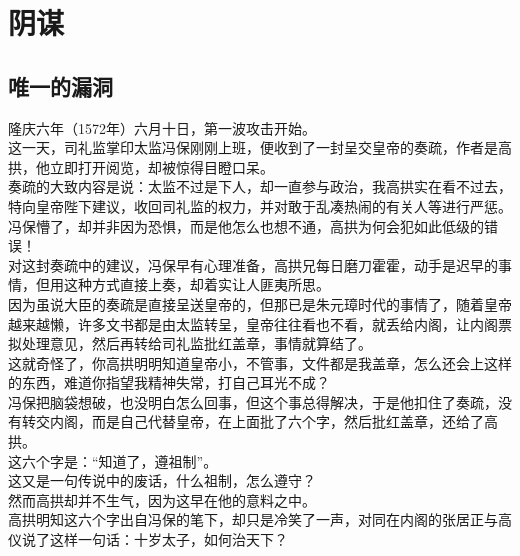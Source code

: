\section{阴谋}
\ifnum{}
	\begin{multicols}{\theparacolNo}
\fi
\subsection{唯一的漏洞}
隆庆六年（1572年）六月十日，第一波攻击开始。\\

这一天，司礼监掌印太监冯保刚刚上班，便收到了一封呈交皇帝的奏疏，作者是高拱，他立即打开阅览，却被惊得目瞪口呆。\\

奏疏的大致内容是说：太监不过是下人，却一直参与政治，我高拱实在看不过去，特向皇帝陛下建议，收回司礼监的权力，并对敢于乱凑热闹的有关人等进行严惩。\\

冯保懵了，却并非因为恐惧，而是他怎么也想不通，高拱为何会犯如此低级的错误！\\

对这封奏疏中的建议，冯保早有心理准备，高拱兄每日磨刀霍霍，动手是迟早的事情，但用这种方式直接上奏，却着实让人匪夷所思。\\

因为虽说大臣的奏疏是直接呈送皇帝的，但那已是朱元璋时代的事情了，随着皇帝越来越懒，许多文书都是由太监转呈，皇帝往往看也不看，就丢给内阁，让内阁票拟处理意见，然后再转给司礼监批红盖章，事情就算结了。\\

这就奇怪了，你高拱明明知道皇帝小，不管事，文件都是我盖章，怎么还会上这样的东西，难道你指望我精神失常，打自己耳光不成？\\

冯保把脑袋想破，也没明白怎么回事，但这个事总得解决，于是他扣住了奏疏，没有转交内阁，而是自己代替皇帝，在上面批了六个字，然后批红盖章，还给了高拱。\\

这六个字是：“知道了，遵祖制”。\\

这又是一句传说中的废话，什么祖制，怎么遵守？\\

然而高拱却并不生气，因为这早在他的意料之中。\\

高拱明知这六个字出自冯保的笔下，却只是冷笑了一声，对同在内阁的张居正与高仪说了这样一句话：十岁太子，如何治天下？\\


\end{multicols}

